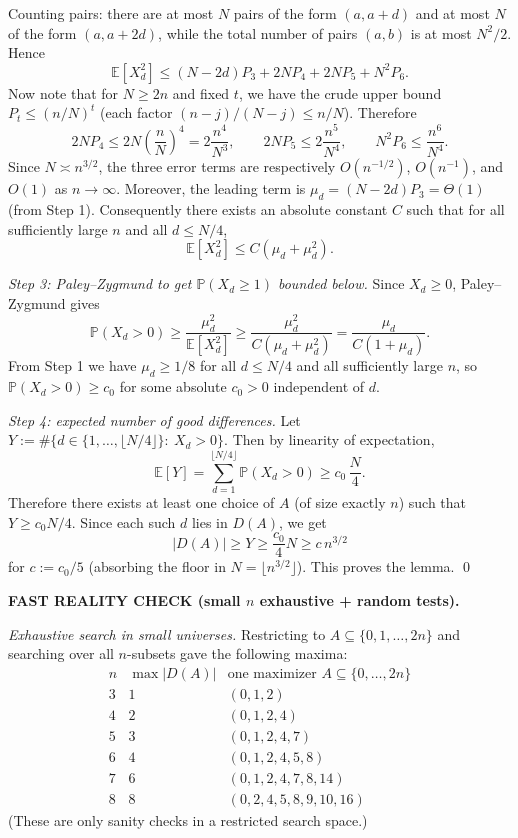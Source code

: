 Counting pairs: there are at most $N$ pairs of the form $(a,a+d)$ and at most $N$ of the form $(a,a+2d)$, while the total number of pairs $(a,b)$ is at most $N^2/2$. Hence
\[
\mathbb{E}[X_d^2]\le (N-2d)P_3 + 2N P_4 + 2N P_5 + N^2 P_6.
\]
Now note that for $N\ge 2n$ and fixed $t$, we have the crude upper bound $P_t\le (n/N)^t$ (each factor $(n-j)/(N-j)\le n/N$). Therefore
\[
2N P_4 \le 2N\left(\frac{n}{N}\right)^4=2\frac{n^4}{N^3},\qquad
2N P_5 \le 2\frac{n^5}{N^4},\qquad
N^2 P_6\le \frac{n^6}{N^4}.
\]
Since $N\asymp n^{3/2}$, the three error terms are respectively $O(n^{-1/2})$, $O(n^{-1})$, and $O(1)$ as $n\to\infty$.
Moreover, the leading term is $\mu_d=(N-2d)P_3=\Theta(1)$ (from Step 1). Consequently there exists an absolute constant $C$ such that for all sufficiently large $n$ and all $d\le N/4$,
\[
\mathbb{E}[X_d^2]\le C(\mu_d+\mu_d^2).
\]

\smallskip
\noindent
\emph{Step 3: Paley--Zygmund to get $\mathbb{P}(X_d\ge 1)$ bounded below.}
Since $X_d\ge 0$, Paley--Zygmund gives
\[
\mathbb{P}(X_d>0)\ge \frac{\mu_d^2}{\mathbb{E}[X_d^2]}\ge \frac{\mu_d^2}{C(\mu_d+\mu_d^2)}=\frac{\mu_d}{C(1+\mu_d)}.
\]
From Step 1 we have $\mu_d\ge 1/8$ for all $d\le N/4$ and all sufficiently large $n$, so $\mathbb{P}(X_d>0)\ge c_0$ for some absolute $c_0>0$ independent of $d$.

\smallskip
\noindent
\emph{Step 4: expected number of good differences.}
Let $Y:=\#\{d\in\{1,\dots,\lfloor N/4\rfloor\}:\ X_d>0\}$. Then by linearity of expectation,
\[
\mathbb{E}[Y]=\sum_{d=1}^{\lfloor N/4\rfloor} \mathbb{P}(X_d>0)\ge c_0\,\frac{N}{4}.
\]
Therefore there exists at least one choice of $A$ (of size exactly $n$) such that $Y\ge c_0 N/4$.
Since each such $d$ lies in $D(A)$, we get
\[
|D(A)|\ge Y\ge \frac{c_0}{4}N\ge c\,n^{3/2}
\]
for $c:=c_0/5$ (absorbing the floor in $N=\lfloor n^{3/2}\rfloor$). This proves the lemma. \qed

\smallskip
\noindent\textbf{FAST REALITY CHECK (small $n$ exhaustive + random tests).}

\smallskip
\noindent
\emph{Exhaustive search in small universes.} Restricting to $A\subseteq\{0,1,\dots,2n\}$ and searching over all $n$-subsets gave the following maxima:
\[
\begin{array}{r|r|l}
 n & \max |D(A)| & \text{one maximizer }A\subseteq\{0,\dots,2n\} \\\hline
 3&1&(0,1,2)\\
 4&2&(0,1,2,4)\\
 5&3&(0,1,2,4,7)\\
 6&4&(0,1,2,4,5,8)\\
 7&6&(0,1,2,4,7,8,14)\\
 8&8&(0,2,4,5,8,9,10,16)
\end{array}
\]
(These are only sanity checks in a restricted search space.)

